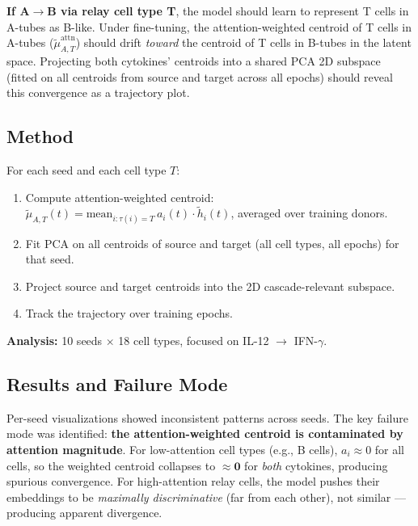 \documentclass[11pt,a4paper]{article}
\begin{document}
\textbf{If A$\to$B via relay cell type T}, the model should learn to represent
T cells in A-tubes as B-like. Under fine-tuning, the attention-weighted
centroid of T cells in A-tubes ($\tilde{\mu}_{A,T}^{\text{attn}}$) should
drift \emph{toward} the centroid of T cells in B-tubes in the latent space.
Projecting both cytokines' centroids into a shared PCA 2D subspace (fitted on
all centroids from source and target across all epochs) should reveal this
convergence as a trajectory plot.

\subsection{Method}

For each seed and each cell type $T$:
\begin{enumerate}[noitemsep]
    \item Compute attention-weighted centroid: $\tilde{\mu}_{A,T}(t) = \text{mean}_{i:\tau(i)=T}\, a_i(t)\cdot \tilde{h}_i(t)$, averaged over training donors.
    \item Fit PCA on all centroids of source and target (all cell types, all epochs) for that seed.
    \item Project source and target centroids into the 2D cascade-relevant subspace.
    \item Track the trajectory over training epochs.
\end{enumerate}

\textbf{Analysis:} 10 seeds $\times$ 18 cell types, focused on IL-12 $\to$ IFN-$\gamma$.

\subsection{Results and Failure Mode}

Per-seed visualizations showed inconsistent patterns across seeds. The key
failure mode was identified: \textbf{the attention-weighted centroid is
contaminated by attention magnitude}. For low-attention cell types (e.g., B
cells), $a_i \approx 0$ for all cells, so the weighted centroid collapses to
$\approx \mathbf{0}$ for \emph{both} cytokines, producing spurious convergence.
For high-attention relay cells, the model pushes their embeddings to be
\emph{maximally discriminative} (far from each other), not similar — producing
apparent divergence.
\end{document}
